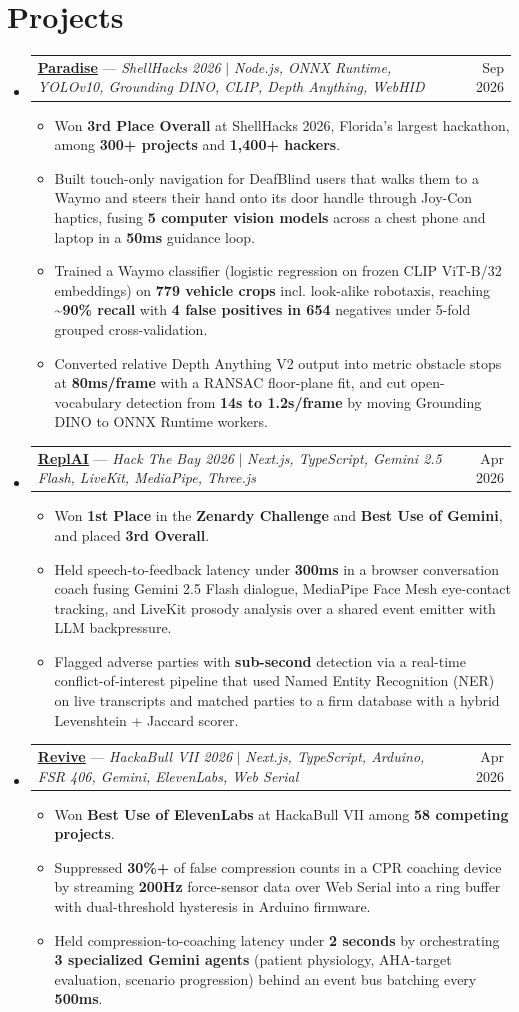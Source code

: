 \documentclass[letterpaper,10pt]{article}
\makeatletter
\newcommand{\resumeItem}[1]{\item\small{#1\vspace{-1pt}}}
\newcommand{\resumeProjectHeading}[2]{%
  \vspace{5pt}\item
  \begin{tabular*}{0.97\textwidth}{l@{\extracolsep{\fill}}r}
    \small #1 & \small #2
  \end{tabular*}\vspace{-5pt}}
\newcommand{\resumeSubHeadingListStart}{\begin{itemize}[leftmargin=0.15in,label={},topsep=0pt,partopsep=0pt,parsep=0pt,itemsep=0pt]}
\newcommand{\resumeSubHeadingListEnd}{\end{itemize}\vspace{-3pt}}
\newcommand{\resumeProjectItemListStart}{\begin{itemize}[leftmargin=*,topsep=1pt,itemsep=0pt,parsep=0pt]}
\newcommand{\resumeProjectItemListEnd}{\end{itemize}\vspace{-5pt}}
\makeatother
\begin{document}
\section{Projects}
\resumeSubHeadingListStart
  \resumeProjectHeading
    {\href{https://github.com/Akhileshreddym/Haptik}{\underline{\textbf{Paradise}}} --- \emph{ShellHacks 2026} $|$ \emph{Node.js, ONNX Runtime, YOLOv10, Grounding DINO, CLIP, Depth Anything, WebHID}}
    {Sep 2026}
  \resumeProjectItemListStart
    \resumeItem{Won \textbf{3rd Place Overall} at ShellHacks 2026, Florida's largest hackathon, among \textbf{300+ projects} and \textbf{1,400+ hackers}.}
    \resumeItem{Built touch-only navigation for DeafBlind users that walks them to a Waymo and steers their hand onto its door handle through Joy-Con haptics, fusing \textbf{5 computer vision models} across a chest phone and laptop in a \textbf{50ms} guidance loop.}
    \resumeItem{Trained a Waymo classifier (logistic regression on frozen CLIP ViT-B/32 embeddings) on \textbf{779 vehicle crops} incl. look-alike robotaxis, reaching \textbf{\textasciitilde{}90\% recall} with \textbf{4 false positives in 654} negatives under 5-fold grouped cross-validation.}
    \resumeItem{Converted relative Depth Anything V2 output into metric obstacle stops at \textbf{80ms/frame} with a RANSAC floor-plane fit, and cut open-vocabulary detection from \textbf{14s to 1.2s/frame} by moving Grounding DINO to ONNX Runtime workers.}
  \resumeProjectItemListEnd
  \resumeProjectHeading
    {\href{https://github.com/hareng8374/ReplAI}{\underline{\textbf{ReplAI}}} --- \emph{Hack The Bay 2026} $|$ \emph{Next.js, TypeScript, Gemini 2.5 Flash, LiveKit, MediaPipe, Three.js}}
    {Apr 2026}
  \resumeProjectItemListStart
    \resumeItem{Won \textbf{1st Place} in the \textbf{Zenardy Challenge} and \textbf{Best Use of Gemini}, and placed \textbf{3rd Overall}.}
    \resumeItem{Held speech-to-feedback latency under \textbf{300ms} in a browser conversation coach fusing Gemini 2.5 Flash dialogue, MediaPipe Face Mesh eye-contact tracking, and LiveKit prosody analysis over a shared event emitter with LLM backpressure.}
    \resumeItem{Flagged adverse parties with \textbf{sub-second} detection via a real-time conflict-of-interest pipeline that used Named Entity Recognition (NER) on live transcripts and matched parties to a firm database with a hybrid Levenshtein + Jaccard scorer.}
  \resumeProjectItemListEnd
  \resumeProjectHeading
    {\href{https://github.com/hareng8374/Revive}{\underline{\textbf{Revive}}} --- \emph{HackaBull VII 2026} $|$ \emph{Next.js, TypeScript, Arduino, FSR 406, Gemini, ElevenLabs, Web Serial}}
    {Apr 2026}
  \resumeProjectItemListStart
    \resumeItem{Won \textbf{Best Use of ElevenLabs} at HackaBull VII among \textbf{58 competing projects}.}
    \resumeItem{Suppressed \textbf{30\%+} of false compression counts in a CPR coaching device by streaming \textbf{200Hz} force-sensor data over Web Serial into a ring buffer with dual-threshold hysteresis in Arduino firmware.}
    \resumeItem{Held compression-to-coaching latency under \textbf{2 seconds} by orchestrating \textbf{3 specialized Gemini agents} (patient physiology, AHA-target evaluation, scenario progression) behind an event bus batching every \textbf{500ms}.}
  \resumeProjectItemListEnd
\resumeSubHeadingListEnd
\end{document}
